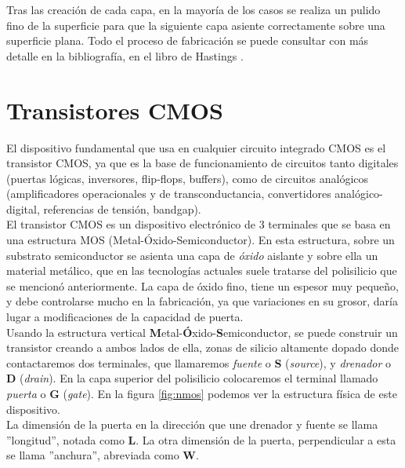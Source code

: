 Tras las creación de cada capa, en la mayoría de los casos se realiza un pulido
fino de la superficie para que la siguiente capa asiente correctamente sobre una
superficie plana. Todo el proceso de fabricación se puede consultar con más
detalle en la bibliografía, en el libro de Hastings \cite{Hastings2001}.\\

\section{Transistores CMOS}\label{cap:transistor_cmos}

El dispositivo fundamental que usa en cualquier circuito integrado CMOS es el
transistor CMOS, ya que es la base de funcionamiento de circuitos tanto digitales
(puertas lógicas, inversores, flip-flops, buffers), como de circuitos analógicos
(amplificadores operacionales y de transconductancia, convertidores analógico-digital,
referencias de tensión, bandgap).\\

El transistor CMOS es un dispositivo electrónico de 3 terminales que se basa
en una estructura MOS (Metal-Óxido-Semiconductor)\cite{Razavi2016}\cite{Allen2002}.
En esta estructura, sobre un
substrato semiconductor se asienta una capa de \textit{óxido} aislante y sobre ella un
material metálico, que en las tecnologías actuales suele tratarse del polisilicio
que se mencionó anteriormente. La capa de óxido fino, tiene un espesor muy pequeño,
y debe controlarse mucho en la fabricación, ya que variaciones en su grosor, daría
lugar a modificaciones de la capacidad de puerta.\\

Usando la estructura vertical \textbf{M}etal-\textbf{Ó}xido-\textbf{S}emiconductor,
se puede construir un transistor creando a ambos lados de ella, zonas de silicio
altamente dopado donde contactaremos dos terminales, que llamaremos \textit{fuente} o \textbf{S}
(\textit{source}), y \textit{drenador} o \textbf{D} (\textit{drain}). En la capa superior
del polisilicio colocaremos el terminal llamado \textit{puerta} o \textbf{G} (\textit{gate}).
En la figura \ref{fig:nmos} podemos ver la estructura física de este dispositivo.\\

La dimensión de la puerta en la dirección que une drenador y fuente se llama
''longitud'', notada como \textbf{L}. La otra dimensión de la puerta, perpendicular a esta
se llama ''anchura'', abreviada como \textbf{W}.\\

